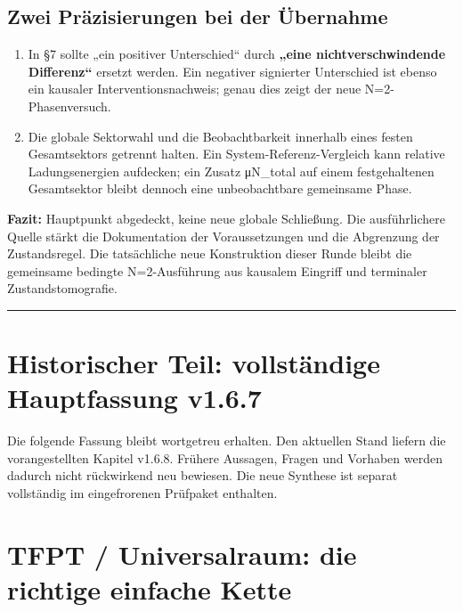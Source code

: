 \subsection{Zwei Präzisierungen bei der
Übernahme}\label{zwei-pruxe4zisierungen-bei-der-uxfcbernahme}

\begin{enumerate}
\def\labelenumi{\arabic{enumi}.}
\tightlist
\item
  In §7 sollte „ein positiver Unterschied`` durch \textbf{„eine
  nichtverschwindende Differenz``} ersetzt werden. Ein negativer
  signierter Unterschied ist ebenso ein kausaler Interventionsnachweis;
  genau dies zeigt der neue N=2-Phasenversuch.
\item
  Die globale Sektorwahl und die Beobachtbarkeit innerhalb eines festen
  Gesamtsektors getrennt halten. Ein System-Referenz-Vergleich kann
  relative Ladungsenergien aufdecken; ein Zusatz μN\_total auf einem
  festgehaltenen Gesamtsektor bleibt dennoch eine unbeobachtbare
  gemeinsame Phase.
\end{enumerate}

\textbf{Fazit:} Hauptpunkt abgedeckt, keine neue globale Schließung. Die
ausführlichere Quelle stärkt die Dokumentation der Voraussetzungen und
die Abgrenzung der Zustandsregel. Die tatsächliche neue Konstruktion
dieser Runde bleibt die gemeinsame bedingte N=2-Ausführung aus kausalem
Eingriff und terminaler Zustandstomografie.

\begin{center}\rule{0.5\linewidth}{0.5pt}\end{center}

\section{Historischer Teil: vollständige Hauptfassung
v1.6.7}\label{historischer-teil-vollstuxe4ndige-hauptfassung-v1.6.7}

Die folgende Fassung bleibt wortgetreu erhalten. Den aktuellen Stand
liefern die vorangestellten Kapitel v1.6.8. Frühere Aussagen, Fragen und
Vorhaben werden dadurch nicht rückwirkend neu bewiesen. Die neue
Synthese ist separat vollständig im eingefrorenen Prüfpaket enthalten.

\section{TFPT / Universalraum: die richtige einfache
Kette}\label{tfpt-universalraum-die-richtige-einfache-kette}

